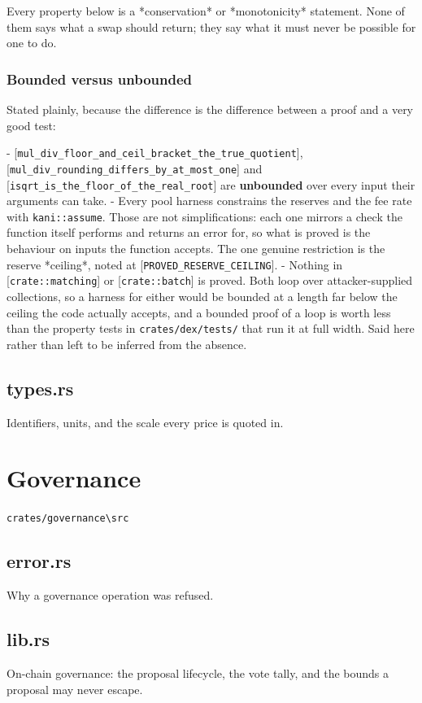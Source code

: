 \documentclass[11pt,a4paper]{article}
\begin{document}
Every property below is a *conservation* or *monotonicity* statement. None
of them says what a swap should return; they say what it must never be
possible for one to do.

\subsubsection{Bounded versus unbounded}

Stated plainly, because the difference is the difference between a proof and
a very good test:

- [\texttt{mul\_div\_floor\_and\_ceil\_bracket\_the\_true\_quotient}],
  [\texttt{mul\_div\_rounding\_differs\_by\_at\_most\_one}] and
  [\texttt{isqrt\_is\_the\_floor\_of\_the\_real\_root}] are \textbf{unbounded} over every input
  their arguments can take.
- Every pool harness constrains the reserves and the fee rate with
  \texttt{kani::assume}. Those are not simplifications: each one mirrors a check
  the function itself performs and returns an error for, so what is proved
  is the behaviour on inputs the function accepts. The one genuine
  restriction is the reserve *ceiling*, noted at [\texttt{PROVED\_RESERVE\_CEILING}].
- Nothing in [\texttt{crate::matching}] or [\texttt{crate::batch}] is proved. Both loop
  over attacker-supplied collections, so a harness for either would be
  bounded at a length far below the ceiling the code actually accepts, and a
  bounded proof of a loop is worth less than the property tests in
  \texttt{crates/dex/tests/} that run it at full width. Said here rather than left to be
  inferred from the absence.

\subsection{types.rs}
Identifiers, units, and the scale every price is quoted in.

\section{Governance}
\noindent\texttt{crates/governance\textbackslash{}src}

\subsection{error.rs}
Why a governance operation was refused.

\subsection{lib.rs}
On-chain governance: the proposal lifecycle, the vote tally, and the bounds
a proposal may never escape.
\end{document}
